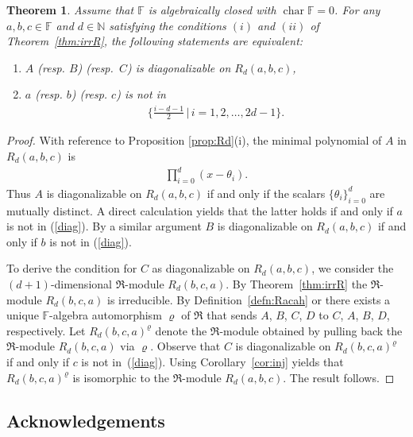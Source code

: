 \documentclass[pdftex]{sigma}
\def\N{\mathbb N}
\def\F{\mathbb F}
\numberwithin{equation}{section}
\newtheorem{Theorem}{Theorem}[section]
\begin{document}
\begin{Theorem}Assume that $\F$ is algebraically closed with $\operatorname{char}\F=0$.
For any $a,b,c\in \F$ and $d\in \N$ satisfying the conditions $(i)$ and $(ii)$ of Theorem~{\rm \ref{thm:irrR}}, the following statements are equivalent:
\begin{enumerate}\itemsep=0pt
\item[$(i)$] $A$ {\rm (}resp. $B${\rm )} {\rm (}resp.~$C${\rm )} is diagonalizable on $R_d(a,b,c)$,
\item[$(ii)$] $a$ {\rm (}resp. $b${\rm )} {\rm (}resp. $c${\rm )} is not in
\begin{gather}\label{diag}
\big\{\tfrac{i-d-1}{2}\,\big|\, i=1,2,\ldots,2d-1\big\}.
\end{gather}
\end{enumerate}
\end{Theorem}
\begin{proof}
With reference to Proposition \ref{prop:Rd}(i), the minimal polynomial of $A$ in $R_d(a,b,c)$ is
\begin{gather*}
\prod_{i=0}^d (x-\theta_i).
\end{gather*}
Thus $A$ is diagonalizable on $R_d(a,b,c)$ if and only if the scalars $\{\theta_i\}_{i=0}^d$ are mutually distinct. A direct calculation yields that the latter holds if and only if $a$ is not in (\ref{diag}). By a similar argument $B$ is diagonalizable on $R_d(a,b,c)$ if and only if $b$ is not in (\ref{diag}).


To derive the condition for $C$ as diagonalizable on $R_d(a,b,c)$, we consider the $(d+1)$-dimensional $\Re$-module $R_d(b,c,a)$. By Theorem~\ref{thm:irrR} the $\Re$-module $R_d(b,c,a)$ is irreducible. By Definition~\ref{defn:Racah} or \cite[Proposition~4.1]{SH:2017-1} there exists a unique $\F$-algebra automorphism $\varrho$ of $\Re$ that sends $A$, $B$, $C$, $D$ to $C$, $A$, $B$, $D$, respectively. Let $R_d(b,c,a)^\varrho$ denote the $\Re$-module obtained by pulling back the $\Re$-module $R_d(b,c,a)$ via $\varrho$. Observe that $C$ is diagonalizable on $R_d(b,c,a)^\varrho$ if and only if $c$ is not in~(\ref{diag}). Using Corollary~\ref{cor:inj} yields that $R_d(b,c,a)^\varrho$ is isomorphic to the $\Re$-module $R_d(a,b,c)$. The result follows.
\end{proof}

\subsection*{Acknowledgements}
\end{document}
